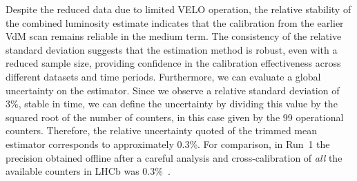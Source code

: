 Despite the reduced data due to limited VELO operation, the relative stability of the combined luminosity estimate indicates that the calibration from the earlier VdM scan remains reliable in the medium term. The consistency of the relative standard deviation suggests that the estimation method is robust, even with a reduced sample size, providing confidence in the calibration effectiveness across different datasets and time periods.
Furthermore, we can evaluate a global uncertainty on the estimator. Since we observe a relative standard deviation of 3\%, stable in time, we can define the uncertainty by dividing this value by the squared root of the number of counters, in this case given by the 99 operational counters. Therefore, the relative uncertainty quoted of the trimmed mean estimator corresponds to approximately 0.3\%. For comparison, in Run~1 the precision obtained offline after a careful analysis and cross-calibration of \textit{all} the available counters in LHCb was 0.3\%~\cite{rosen}.